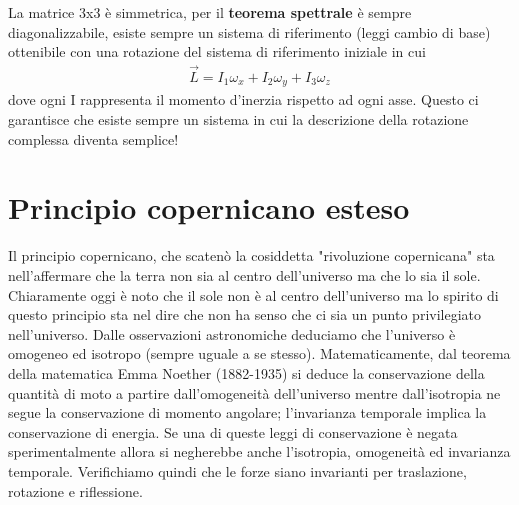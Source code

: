 \documentclass[10pt,a4paper]{article}
\begin{document}
La matrice 3x3 è simmetrica, per il \textbf{teorema spettrale} è sempre diagonalizzabile, esiste sempre un sistema di riferimento (leggi cambio di base) ottenibile con una rotazione del sistema di riferimento iniziale in cui
\begin{align*}
	\vec{L} = I_1 \omega_x + I_2 \omega_y + I_3 \omega_z
\end{align*}
dove ogni I rappresenta il momento d'inerzia rispetto ad ogni asse. Questo ci garantisce che esiste sempre un sistema in cui la descrizione della rotazione complessa diventa semplice!
\section{Principio copernicano esteso}
Il principio copernicano, che scatenò la cosiddetta "rivoluzione copernicana" sta nell'affermare che la terra non sia al centro dell'universo ma che lo sia il sole. Chiaramente oggi è noto che il sole non è al centro dell'universo ma lo spirito di questo principio sta nel dire che non ha senso che ci sia un punto privilegiato nell'universo. Dalle osservazioni astronomiche deduciamo che l'universo è omogeneo ed isotropo (sempre uguale a se stesso). Matematicamente, dal teorema della matematica Emma Noether (1882-1935) si deduce la conservazione della quantità di moto a partire dall'omogeneità dell'universo mentre dall'isotropia ne segue la conservazione di momento angolare; l'invarianza temporale implica la conservazione di energia. Se una di queste leggi di conservazione è negata sperimentalmente allora si negherebbe anche l'isotropia, omogeneità ed invarianza temporale. Verifichiamo quindi che le forze siano invarianti per traslazione, rotazione e riflessione.
\end{document}
